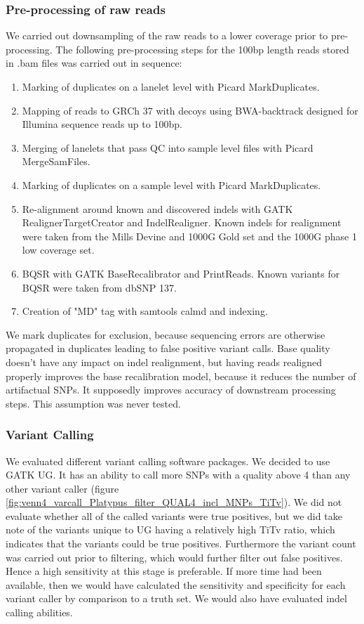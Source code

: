 \subsubsection{Pre-processing of raw reads}
We carried out downsampling of the raw reads to a lower coverage prior to pre-processing. The following pre-processing steps for the 100bp length reads stored in .bam files was carried out in sequence:
\begin{enumerate}
\item Marking of duplicates on a lanelet level with Picard MarkDuplicates.
\item Mapping of reads to \gls{GRCh} 37 with decoys using BWA-backtrack\cite{Li15072009} designed for Illumina sequence reads up to 100bp.
\item Merging of lanelets that pass \gls{QC} into sample level files with Picard MergeSamFiles.
\item Marking of duplicates on a sample level with Picard MarkDuplicates.
\item Re-alignment around known and discovered indels with \gls{GATK} RealignerTargetCreator and IndelRealigner. Known indels for realignment were taken from the Mills Devine and \gls{1000G} Gold set and the 1000G phase 1 low coverage set.
\item \Gls{BQSR} with \gls{GATK} BaseRecalibrator and PrintReads. Known variants for \gls{BQSR} were taken from dbSNP 137.
\item Creation of "MD" tag with samtools calmd and indexing.
\end{enumerate}

We mark duplicates for exclusion, because sequencing errors are otherwise propagated in duplicates leading to false positive variant calls. Base quality doesn't have any impact on indel realignment, but having reads realigned properly improves the base recalibration model, because it reduces the number of artifactual \glspl{SNP}. It supposedly improves accuracy of downstream processing steps. This assumption was never tested.

\subsubsection{Variant Calling}
We evaluated different variant calling software packages. We decided to use \gls{GATK} \gls{UG}. It has an ability to call more \glspl{SNP} with a quality above 4 than any other variant caller (figure \ref{fig:venn4_varcall_Platypus_filter_QUAL4_incl_MNPs_TiTv}). We did not evaluate whether all of the called variants were true positives, but we did take note of the variants unique to \gls{UG} having a relatively high \gls{TiTv} ratio, which indicates that the variants could be true positives. Furthermore the variant count was carried out prior to filtering, which would further filter out false positives. Hence a high sensitivity at this stage is preferable. If more time had been available, then we would have calculated the sensitivity and specificity for each variant caller by comparison to a truth set. We would also have evaluated indel calling abilities.

